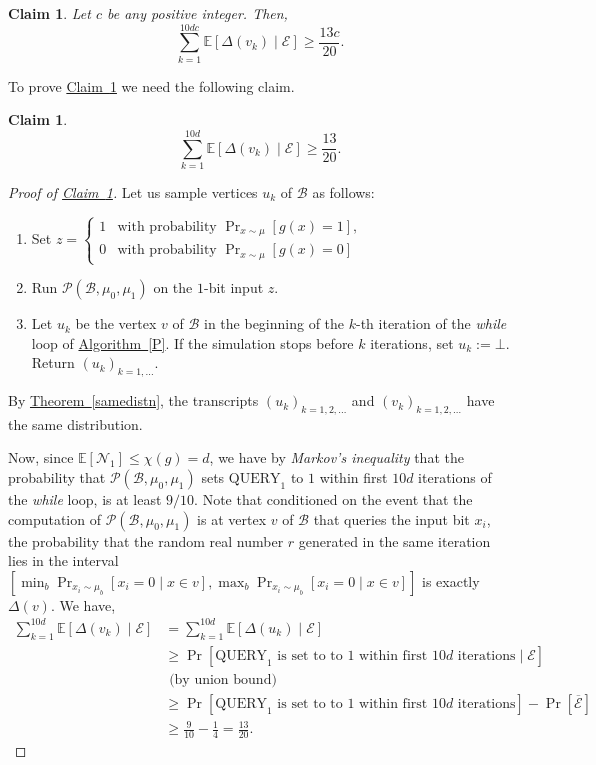 \documentclass[11pt]{article}
\numberwithin{equation}{section}
\newtheorem{claim}[theorem]{Claim}
\theoremstyle{definition}
\theoremstyle{plain}
\newcommand{\expref}[2]{\hyperref[#2]{#1~\ref{#2}}}
\newcommand{\q}{\text{QUERY}}
\newcommand{\clB}{\mathcal{B}}
\newcommand{\clE}{\mathcal{E}}
\newcommand{\clP}{\mathcal{P}}
\newcommand{\clN}{\mathcal{N}}
\newcommand{\E}{\mathbb{E}}
\begin{document}
\begin{claim}
\label{sumofdelta2}
Let $c$ be any positive integer. Then,
\[\sum_{k=1}^{10dc} \E[\Delta(v_k) \mid \clE]  \geq \frac{13c}{20}.\]
\end{claim}
To prove \expref{Claim}{sumofdelta2} we need the following claim.
\begin{claim}
\label{sumofdelta}
\[\sum_{k=1}^{10d} \E[\Delta(v_k) \mid \clE]  \geq \frac{13}{20}.\]
\end{claim}
\begin{proof}[Proof of {\expref{Claim}{sumofdelta}}]
Let us sample vertices $u_k$ of $\clB$ as follows:
\begin{enumerate}
\item Set $z=\left\{\begin{array}{ll}
1 & \mbox{with probability $\Pr_{x \sim \mu}[g(x)=1]$}, \\
0 & \mbox{with probability $\Pr_{x \sim \mu}[g(x)=0]$}
\end{array}\right.$
\item Run $\clP(\clB, \mu_0, \mu_1)$ on the $1$-bit input $z$.
\item Let $u_k$ be the vertex $v$ of $\clB$ in the beginning of the $k$-th iteration of the \emph{while} loop of \expref{Algorithm}{P}. If the simulation stops before $k$ iterations, set $u_k:=\bot$. Return $(u_k)_{k=1,\ldots}$.
\end{enumerate}
By \expref{Theorem}{samedistn}, the transcripts $(u_k)_{k=1,2,\ldots}$ and $(v_k)_{{k=1,2,\ldots}}$ have the same distribution.

Now, since $\E[\clN_1] \leq \chi(g) = d$, we have by \emph{Markov's inequality} that the probability that $\clP(\clB, \mu_0, \mu_1)$ sets $\q_1$ to $1$ within first $10d$ iterations of the \emph{while} loop, is at least $9/10$. Note that conditioned on the event that the computation of $\clP(\clB, \mu_0, \mu_1)$ is at vertex $v$ of $\clB$ that queries the input bit $x_i$, the probability that the random real number $r$ generated in the same iteration lies in the interval $[\min_b \Pr_{x_i \sim \mu_b}[x_i=0 \mid x \in v], \max_b \Pr_{x_i \sim \mu_b}[x_i=0 \mid x \in v]]$ is exactly $\Delta(v)$. We have,
\begin{align}
\sum_{k=1}^{10d} \E[\Delta(v_k) \mid \clE]&=\sum_{k=1}^{10d} \E[\Delta(u_k) \mid \clE] \nonumber \\
&\geq \Pr[\mbox{$\q_1$ is set to to $1$ within first $10d$ iterations} \mid \clE] \nonumber \\
&\mbox{\ \ \ \ \ \ \ \ \ \ \ \ \ \ \ \ (by union bound)} \nonumber \\
&\geq \Pr[\mbox{$\q_1$ is set to to $1$ within first $10d$ iterations}]-\Pr[\overline{\clE}] \nonumber \\
& \geq \frac{9}{10}-\frac{1}{4}=\frac{13}{20}. \nonumber
\end{align}
\end{proof}
\end{document}
